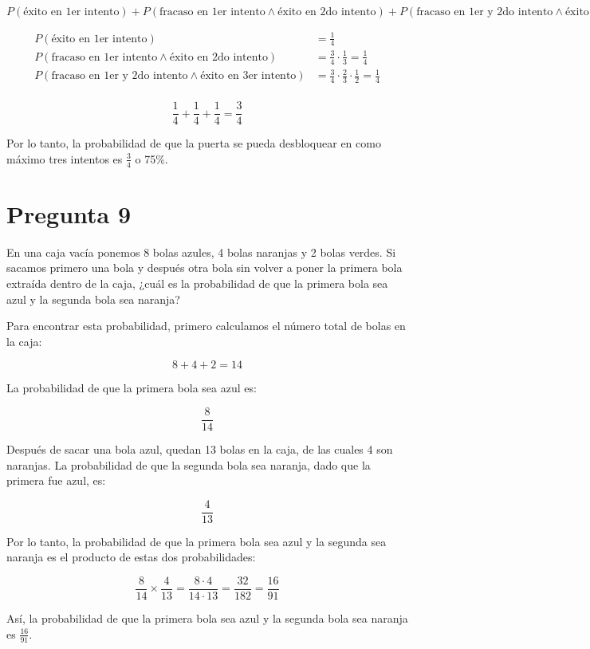 \documentclass{article}
\begin{document}
\[
P(\text{éxito en 1er intento}) + P(\text{fracaso en 1er intento} \land \text{éxito en 2do intento}) + P(\text{fracaso en 1er y 2do intento} \land \text{éxito en 3er intento})
\]

\[
\begin{align*}
P(\text{éxito en 1er intento}) & = \frac{1}{4} \\
P(\text{fracaso en 1er intento} \land \text{éxito en 2do intento}) & = \frac{3}{4} \cdot \frac{1}{3} = \frac{1}{4} \\
P(\text{fracaso en 1er y 2do intento} \land \text{éxito en 3er intento}) & = \frac{3}{4} \cdot \frac{2}{3} \cdot \frac{1}{2} = \frac{1}{4} \\
\end{align*}
\]

\[
\frac{1}{4} + \frac{1}{4} + \frac{1}{4} = \frac{3}{4}
\]

Por lo tanto, la probabilidad de que la puerta se pueda desbloquear en como máximo tres intentos es \( \frac{3}{4} \) o 75\%.

\section*{Pregunta 9}

En una caja vacía ponemos 8 bolas azules, 4 bolas naranjas y 2 bolas verdes. Si sacamos primero una bola y después otra bola sin volver a poner la primera bola extraída dentro de la caja, ¿cuál es la probabilidad de que la primera bola sea azul y la segunda bola sea naranja?

Para encontrar esta probabilidad, primero calculamos el número total de bolas en la caja:

\[ 8 + 4 + 2 = 14 \]

La probabilidad de que la primera bola sea azul es:

\[ \frac{8}{14} \]

Después de sacar una bola azul, quedan 13 bolas en la caja, de las cuales 4 son naranjas. La probabilidad de que la segunda bola sea naranja, dado que la primera fue azul, es:

\[ \frac{4}{13} \]

Por lo tanto, la probabilidad de que la primera bola sea azul y la segunda sea naranja es el producto de estas dos probabilidades:

\[
\frac{8}{14} \times \frac{4}{13} = \frac{8 \cdot 4}{14 \cdot 13} = \frac{32}{182} = \frac{16}{91}
\]

Así, la probabilidad de que la primera bola sea azul y la segunda bola sea naranja es \(\frac{16}{91}\).
\end{document}
